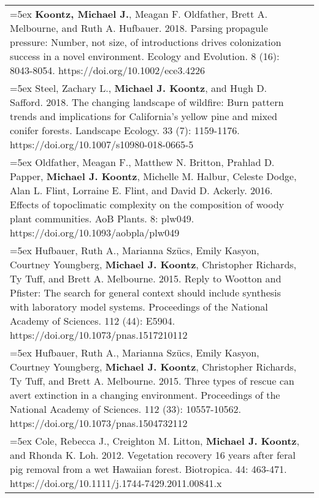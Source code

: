 \begin{longtable}{@{} >{\raggedright}p{5.25in} >{\raggedleft}X @{}}
\hangindent=5ex \textbf{Koontz, Michael J.}, Meagan F. Oldfather, Brett A. Melbourne, and Ruth A. Hufbauer. 2018. Parsing propagule pressure: Number, not size, of introductions drives colonization success in a novel environment. Ecology and Evolution. 8 (16): 8043-8054. https://doi.org/10.1002/ece3.4226 & 2018 \tabularnewline

\hangindent=5ex Steel, Zachary L., \textbf{Michael J. Koontz}, and Hugh D. Safford. 2018. The changing landscape of wildfire: Burn pattern trends and implications for California's yellow pine and mixed conifer forests. Landscape Ecology. 33 (7): 1159-1176. https://doi.org/10.1007/s10980-018-0665-5 & 2018 \tabularnewline

\hangindent=5ex Oldfather, Meagan F., Matthew N. Britton, Prahlad D. Papper, \textbf{Michael J. Koontz}, Michelle M. Halbur, Celeste Dodge, Alan L. Flint, Lorraine E. Flint, and David D. Ackerly. 2016. Effects of topoclimatic complexity on the composition of woody plant communities. AoB Plants. 8: plw049. https://doi.org/10.1093/aobpla/plw049 & 2016 \tabularnewline

\hangindent=5ex Hufbauer, Ruth A., Marianna Sz\"ucs, Emily Kasyon, Courtney Youngberg, \textbf{Michael J. Koontz}, Christopher Richards, Ty Tuff, and Brett A. Melbourne. 2015. Reply to Wootton and Pfister: The search for general context should include synthesis with laboratory model systems. Proceedings of the National Academy of Sciences. 112 (44): E5904. https://doi.org/10.1073/pnas.1517210112 & 2015 \tabularnewline

\hangindent=5ex Hufbauer, Ruth A., Marianna Sz\"ucs, Emily Kasyon, Courtney Youngberg, \textbf{Michael J. Koontz}, Christopher Richards, Ty Tuff, and Brett A. Melbourne. 2015. Three types of rescue can avert extinction in a changing environment. Proceedings of the National Academy of Sciences. 112 (33): 10557-10562. https://doi.org/10.1073/pnas.1504732112 & 2015 \tabularnewline

\hangindent=5ex Cole, Rebecca J., Creighton M. Litton, \textbf{Michael J. Koontz}, and Rhonda K. Loh. 2012. Vegetation recovery 16 years after feral pig removal from
a wet Hawaiian forest. Biotropica. 44: 463-471. https://doi.org/10.1111/j.1744-7429.2011.00841.x & 2012 \tabularnewline

\end{longtable}
